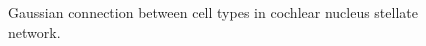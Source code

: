 \begin{figure}[htb]
  \begin{center}
    \caption{Gaussian connection between cell types in cochlear nucleus stellate network.}
    \label{fig:CNconn}
  \end{center}
\end{figure}


